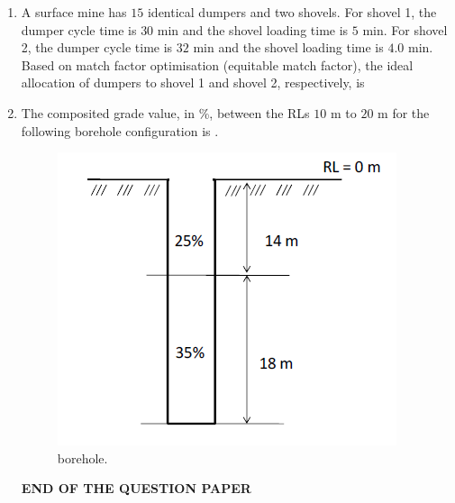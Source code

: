 \documentclass[journal]{IEEEtran}
\begin{document}
\begin{enumerate}
\item A surface mine has $15$ identical dumpers and two shovels. For shovel 1, the dumper cycle time is 
$30$ min and the shovel loading time is $5$ min. For shovel 2, the dumper cycle time is $32$ min and the 
shovel loading time is $4.0$ min. Based on match factor optimisation (equitable match factor), the ideal 
allocation of dumpers to shovel 1 and shovel 2, respectively, is
  \begin{enumerate}
  \end{enumerate}
\hfill{}
\item The composited grade value, in \%, between the RLs $10$ m to $20$ m for the following borehole configuration is \underline{\hspace{2cm}}.

\begin{figure}[h!]
    \centering
    \includegraphics[width=0.6\linewidth]{figs/borehole.png}
    \caption{borehole.}
    \label{fig:borehole}
\end{figure}
\hfill{}
\vspace{2em}
\begin{center}
    \textbf{\textsc{END OF THE QUESTION PAPER}}
\end{center}
\end{enumerate}
\end{document}
